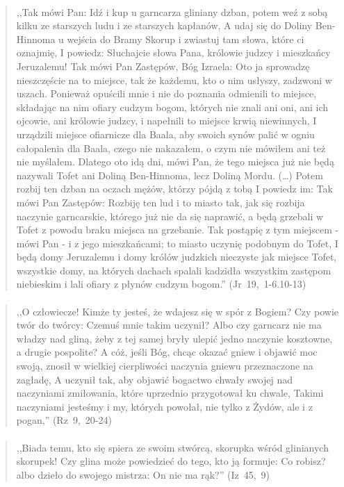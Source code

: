 \documentclass[10pt,a4paper,oneside]{article}
\begin{document}
\paragraph{}
\begin{quote}
,,Tak mówi Pan: Idź i kup u garncarza gliniany dzban, potem weź z sobą kilku ze starszych ludu i ze starszych kapłanów, A udaj się do Doliny Ben-Hinnoma u wejścia do Bramy Skorup i zwiastuj tam słowa, które ci oznajmię, I powiedz: Słuchajcie słowa Pana, królowie judzcy i mieszkańcy Jeruzalemu! Tak mówi Pan Zastępów, Bóg Izraela: Oto ja sprowadzę nieszczęście na to miejsce, tak że każdemu, kto o nim usłyszy, zadzwoni w uszach. Ponieważ opuścili mnie i nie do poznania odmienili to miejsce, składając na nim ofiary cudzym bogom, których nie znali ani oni, ani ich ojcowie, ani królowie judzcy, i napełnili to miejsce krwią niewinnych, I urządzili miejsce ofiarnicze dla Baala, aby swoich synów palić w ogniu całopalenia dla Baala, czego nie nakazałem, o czym nie mówiłem ani też nie myślałem. Dlatego oto idą dni, mówi Pan, że tego miejsca już nie będą nazywali Tofet ani Doliną Ben-Hinnoma, lecz Doliną Mordu. (\ldots) Potem rozbij ten dzban na oczach mężów, którzy pójdą z tobą I powiedz im: Tak mówi Pan Zastępów: Rozbiję ten lud i to miasto tak, jak się rozbija naczynie garncarskie, którego już nie da się naprawić, a będą grzebali w Tofet z powodu braku miejsca na grzebanie. Tak postąpię z tym miejscem - mówi Pan - i z jego mieszkańcami; to miasto uczynię podobnym do Tofet, I będą domy Jeruzalemu i domy królów judzkich nieczyste jak miejsce Tofet, wszystkie domy, na których dachach spalali kadzidła wszystkim zastępom niebieskim i lali ofiary z płynów cudzym bogom.'' \mbox{(Jr 19, 1-6.10-13)}
\end{quote}
\paragraph{}
\begin{quote}
,,O człowiecze! Kimże ty jesteś, że wdajesz się w spór z Bogiem? Czy powie twór do twórcy: Czemuś mnie takim uczynił? Albo czy garncarz nie ma władzy nad gliną, żeby z tej samej bryły ulepić jedno naczynie kosztowne, a drugie pospolite? A cóż, jeśli Bóg, chcąc okazać gniew i objawić moc swoją, znosił w wielkiej cierpliwości naczynia gniewu przeznaczone na zagładę, A uczynił tak, aby objawić bogactwo chwały swojej nad naczyniami zmiłowania, które uprzednio przygotował ku chwale, Takimi naczyniami jesteśmy i my, których powołał, nie tylko z Żydów, ale i z pogan,'' \mbox{(Rz 9, 20-24)}
\end{quote}
\paragraph{}
\begin{quote}
,,Biada temu, kto się spiera ze swoim stwórcą, skorupka wśród glinianych skorupek! Czy glina może powiedzieć do tego, kto ją formuje: Co robisz? albo dzieło do swojego mistrza: On nie ma rąk?'' \mbox{(Iz 45, 9)}
\end{quote}
\end{document}
